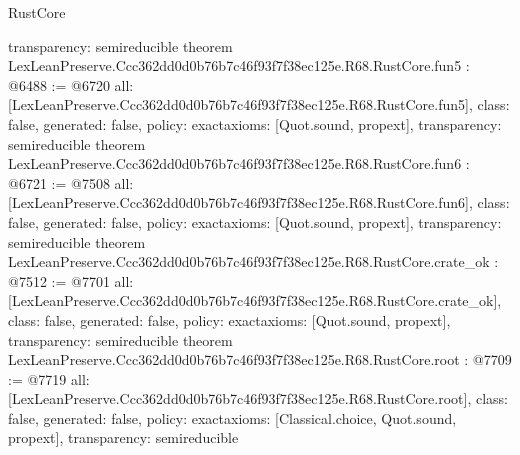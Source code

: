 \begin{lexlean}{RustCore}
\begin{coremodule}
{  transparency: semireducible
}
theorem LexLeanPreserve.Ccc362dd0d0b76b7c46f93f7f38ec125e.R68.RustCore.fun5 : @6488 := @6720 {
  all: [LexLeanPreserve.Ccc362dd0d0b76b7c46f93f7f38ec125e.R68.RustCore.fun5],
  class: false,
  generated: false,
  policy: exact{axioms: [Quot.sound, propext]},
  transparency: semireducible
}
theorem LexLeanPreserve.Ccc362dd0d0b76b7c46f93f7f38ec125e.R68.RustCore.fun6 : @6721 := @7508 {
  all: [LexLeanPreserve.Ccc362dd0d0b76b7c46f93f7f38ec125e.R68.RustCore.fun6],
  class: false,
  generated: false,
  policy: exact{axioms: [Quot.sound, propext]},
  transparency: semireducible
}
theorem LexLeanPreserve.Ccc362dd0d0b76b7c46f93f7f38ec125e.R68.RustCore.crate_ok : @7512 := @7701 {
  all: [LexLeanPreserve.Ccc362dd0d0b76b7c46f93f7f38ec125e.R68.RustCore.crate_ok],
  class: false,
  generated: false,
  policy: exact{axioms: [Quot.sound, propext]},
  transparency: semireducible
}
theorem LexLeanPreserve.Ccc362dd0d0b76b7c46f93f7f38ec125e.R68.RustCore.root : @7709 := @7719 {
  all: [LexLeanPreserve.Ccc362dd0d0b76b7c46f93f7f38ec125e.R68.RustCore.root],
  class: false,
  generated: false,
  policy: exact{axioms: [Classical.choice, Quot.sound, propext]},
  transparency: semireducible
}


\end{coremodule}
\end{lexlean}
